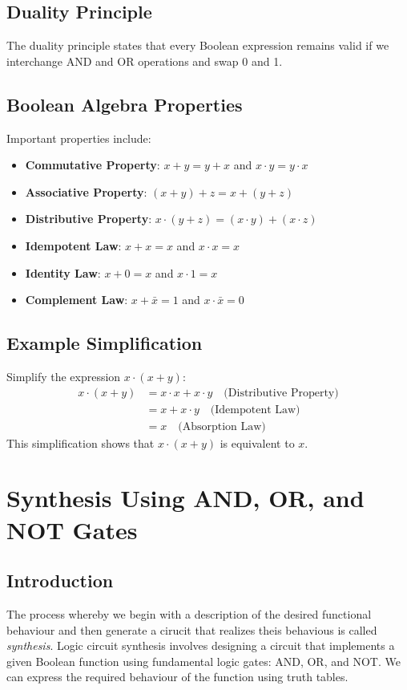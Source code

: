 \documentclass{article}
\begin{document}
\subsection{Duality Principle}
The duality principle states that every Boolean expression remains valid if we interchange AND and OR operations and swap 0 and 1.

\subsection{Boolean Algebra Properties}
Important properties include:
\begin{itemize}
    \item \textbf{Commutative Property}: $x + y = y + x$ and $x \cdot y = y \cdot x$
    \item \textbf{Associative Property}: $(x + y) + z = x + (y + z)$
    \item \textbf{Distributive Property}: $x \cdot (y + z) = (x \cdot y) + (x \cdot z)$
    \item \textbf{Idempotent Law}: $x + x = x$ and $x \cdot x = x$
    \item \textbf{Identity Law}: $x + 0 = x$ and $x \cdot 1 = x$
    \item \textbf{Complement Law}: $x + \bar{x} = 1$ and $x \cdot \bar{x} = 0$
\end{itemize}

\subsection{Example Simplification}
Simplify the expression $x \cdot (x + y)$:
\begin{align*}
    x \cdot (x + y) &= x \cdot x + x \cdot y \quad \text{(Distributive Property)} \\
    &= x + x \cdot y \quad \text{(Idempotent Law)} \\
    &= x \quad \text{(Absorption Law)}
\end{align*}
This simplification shows that $x \cdot (x + y)$ is equivalent to $x$.

\section{Synthesis Using AND, OR, and NOT Gates}

\subsection{Introduction}
The process whereby we begin with a description of the desired functional behaviour and then generate a cirucit that realizes theis behavious is called \textit{synthesis}. Logic circuit synthesis involves designing a circuit that implements a given Boolean function using fundamental logic gates: AND, OR, and NOT. We can express the required behaviour of the function using truth tables. 
\end{document}
